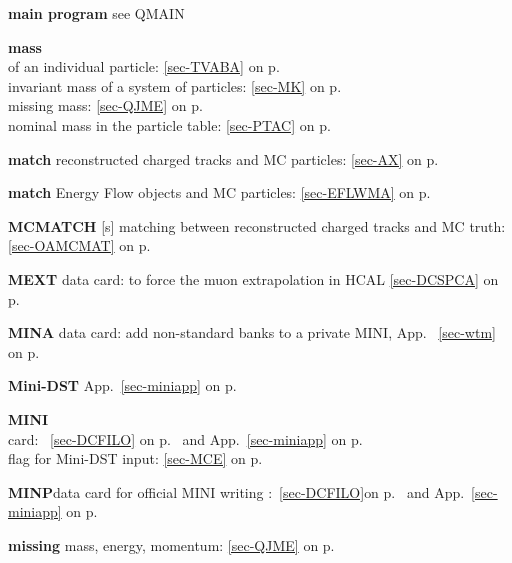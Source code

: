  \item{\bf main program    }see QMAIN\\
 \item{\bf mass    }\\
 \subitem of an individual particle: \ref{sec-TVABA} on p.~\pageref{sec-TVABA}\\
 \subitem invariant mass of a system of particles: \ref{sec-MK} on p.~\pageref{sec-MK}\\
 \subitem missing mass: \ref{sec-QJME} on p.~\pageref{sec-QJME}\\
 \subitem nominal mass in the particle table: \ref{sec-PTAC} on p.~\pageref{sec-PTAC}\\
 \item{\bf match   }reconstructed charged tracks and MC particles: \ref{sec-AX} on p.~\pageref{sec-AX}\\
 \item{\bf match   }Energy Flow objects and MC particles: \ref{sec-EFLWMA} on p.~\pageref{sec-EFLWMA} \\
 \item{\bf MCMATCH }[s] matching between reconstructed charged tracks and MC truth:
 \ref{sec-OAMCMAT} on p.~\pageref{sec-OAMCMAT}\\
 \item{\bf MEXT    }data card: to force the muon extrapolation in HCAL
 \ref{sec-DCSPCA} on p.~\pageref{sec-DCSPCA}\\
 \item{\bf MINA    }data card: add non-standard banks to a private MINI, App. ~\ref{sec-wtm} on p.~\pageref{sec-wtm}\\
 \item{\bf Mini-DST   }App.~\ref{sec-miniapp} on p.~\pageref{sec-miniapp}\\
 \item{\bf MINI}\\
 \subitem card: ~\ref{sec-DCFILO} on  p.~\pageref{sec-DCFILO} and App.~\ref{sec-miniapp} on
 p.~\pageref{sec-miniapp}\\
 \subitem flag for Mini-DST input: \ref{sec-MCE} on p.~\pageref{sec-MCE}\\
 \item{\bf MINP}data card for official MINI writing
 :~\ref{sec-DCFILO}on p.~\pageref{sec-DCFILO} and App.~\ref{sec-miniapp} on
 p.~\pageref{sec-miniapp}\\
 \item{\bf missing     }mass, energy, momentum: \ref{sec-QJME} on p.~\pageref{sec-QJME}\\
